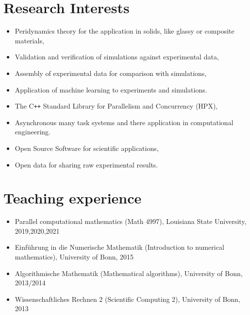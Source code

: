 \documentclass[11pt,a4paper,sans]{moderncv}
\begin{document}
\section{Research Interests}

\begin{itemize}[leftmargin=4cm]
\item Peridynamics theory for the application in solids, like glassy or composite materials,
\item Validation and verification of simulations against experimental data,
\item Assembly of experimental data for comparison with simulations,
\item Application of machine learning to experiments and simulations.
\end{itemize}
\begin{itemize}[leftmargin=4cm]
\item The C\texttt{++} Standard Library for Parallelism and Concurrency (HPX),
\item Asynchronous many task systems and there application in computational engineering.
\end{itemize}
\begin{itemize}[leftmargin=4cm]
\item Open Source Software for scientific applications,
\item Open data for sharing raw experimental results.
\end{itemize}
\section{Teaching experience}
\begin{itemize}[leftmargin=4cm]
\item Parallel computational mathematics (Math 4997), Louisiana State University, 2019,2020,2021
\end{itemize}

\begin{itemize}[leftmargin=4cm]
\item Einf\"uhrung in die Numerische Mathematik (Introduction to numerical mathematics), University of Bonn, 2015
\item Algorithmische Mathematik (Mathematical algorithms), University of Bonn, 2013/2014
\item Wissenschaftliches Rechnen 2 (Scientific Computing 2),  University of Bonn, 2013 
\end{itemize}
\end{document}
